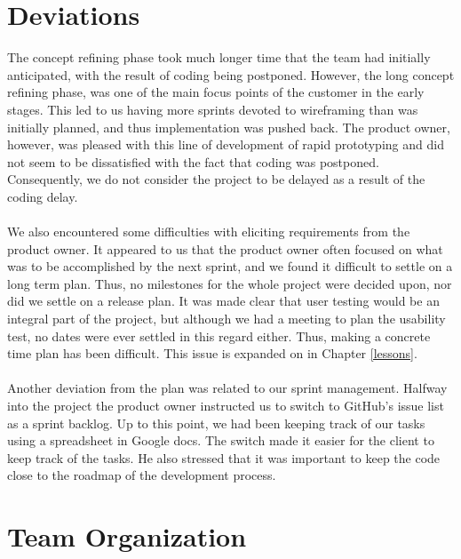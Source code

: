 \section{Deviations}

The concept refining phase took much longer time that the team had initially anticipated, with the result of coding being postponed. However, the long concept refining phase, was one of the main focus points of the customer in the early stages. This led to us having more sprints devoted to wireframing than was initially planned, and thus implementation was pushed back. The product owner, however, was pleased with this line of development of rapid prototyping and did not seem to be dissatisfied with the fact that coding was postponed. Consequently, we do not consider the project to be delayed as a result of the coding delay.
\\\\
We also encountered some difficulties with eliciting requirements from the product owner. It appeared to us that the product owner often focused on what was to be accomplished by the next sprint, and we found it difficult to settle on a long term plan. Thus, no milestones for the whole project were decided upon, nor did we settle on a release plan. It was made clear that user testing would be an integral part of the project, but although we had a meeting to plan the usability test, no dates were ever settled in this regard either. Thus, making a concrete time plan has been difficult. This issue is expanded on in Chapter \ref{lessons}. 
\\\\
Another deviation from the plan was related to our sprint management. Halfway into the project the product owner instructed us to switch to GitHub's issue list as a sprint backlog. Up to this point, we had been keeping track of our tasks using a spreadsheet in Google docs. The switch made it easier for the client to keep track of the tasks. He also stressed that it was important to keep the code close to the roadmap of the development process.

\section{Team Organization}
